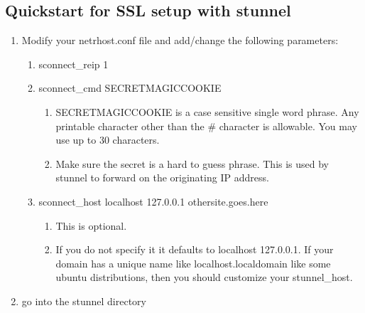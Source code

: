 \documentclass[letterpaper,10pt,english]{sphinxmanual}
\begin{document}
\subsection{Quickstart for SSL setup with stunnel}
\label{\detokenize{security:quickstart-for-ssl-setup-with-stunnel}}\begin{enumerate}
%
\item {} 
\sphinxAtStartPar
Modify your netrhost.conf file and add/change the following parameters:
\begin{enumerate}
%
\item {} 
\sphinxAtStartPar
sconnect\_reip 1

\item {} 
\sphinxAtStartPar
sconnect\_cmd SECRET\sphinxhyphen{}MAGIC\sphinxhyphen{}COOKIE
\begin{enumerate}
%
\item {} 
\sphinxAtStartPar
SECRET\sphinxhyphen{}MAGIC\sphinxhyphen{}COOKIE is a case sensitive single word phrase. Any printable character other than the \textquotesingle{}\#\textquotesingle{} character is allowable.  You may use up to 30 characters.

\item {} 
\sphinxAtStartPar
Make sure the secret is a hard to guess phrase.  This is used by stunnel to forward on the originating IP address.

\end{enumerate}

\item {} 
\sphinxAtStartPar
sconnect\_host localhost 127.0.0.1 othersite.goes.here
\begin{enumerate}
%
\item {} 
\sphinxAtStartPar
This is optional.

\item {} 
\sphinxAtStartPar
If you do not specify it it defaults to \textquotesingle{}localhost 127.0.0.1\textquotesingle{}.  If your domain has a unique name like \textquotesingle{}localhost.localdomain\textquotesingle{} like some ubuntu distributions, then you should customize your stunnel\_host.

\end{enumerate}

\end{enumerate}

\item {} 
\sphinxAtStartPar
go into the stunnel directory


\end{enumerate}
\end{document}
